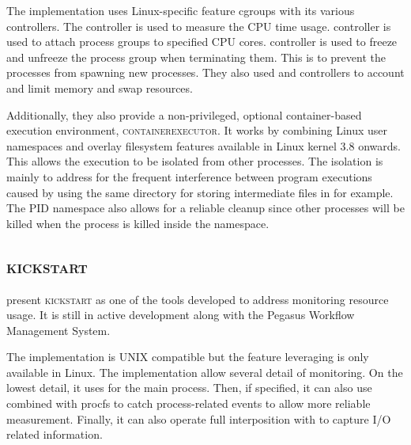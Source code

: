 The implementation uses Linux-specific feature cgroups with its various controllers.
The  controller is used to measure the CPU time usage.
 controller is used to attach process groups to specified CPU cores.
 controller is used to freeze and unfreeze the process group when terminating them.
This is to prevent the processes from spawning new processes.
They also used  and  controllers to account and limit memory and swap resources.


Additionally, they also provide a non-privileged, optional container-based execution environment, \textsc{containerexecutor}.
It works by combining Linux user namespaces and overlay filesystem features available in Linux kernel 3.8 onwards.
This allows the execution to be isolated from other processes.
The isolation is mainly to address for the frequent interference between program executions caused by using the same directory for storing intermediate files in  for example.
The PID namespace also allows for a reliable cleanup since other processes will be killed when the  process is killed inside the namespace.


\subsection{\textsc{kickstart}}

\citet{juvePracticalResourceMonitoring2015} present \textsc{kickstart} \citep[part of][]{PegasusWorkflowManagement2019} as one of the tools developed to address monitoring resource usage.
It is still in active development along with the Pegasus Workflow Management System.

The implementation is UNIX compatible but the feature leveraging  is only available in Linux.
The implementation allow several detail of monitoring.
On the lowest detail, it uses  for the main process.
Then, if specified, it can also use  combined with procfs to catch process-related events to allow more reliable measurement.
Finally, it can also operate full interposition with  to capture I/O related information.

